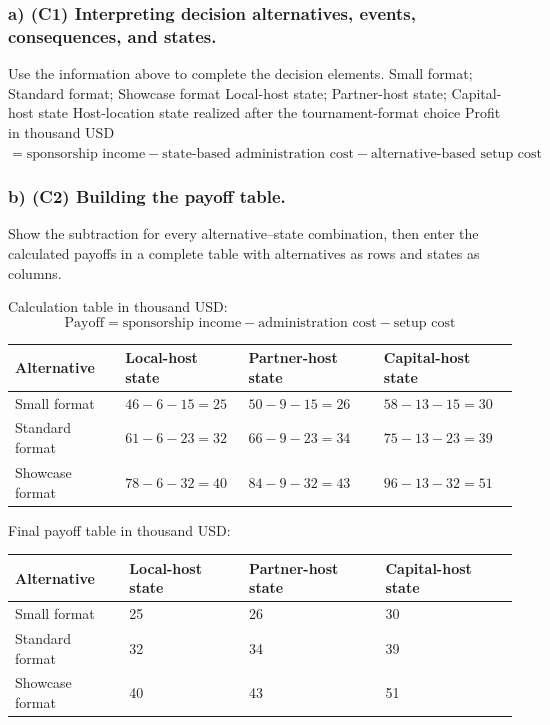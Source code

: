 \subsubsection*{a) \textbf{(C1)} Interpreting decision alternatives, events, consequences, and states.}
\label{subsec:problem12-regional-debate-tournament-c1}
Use the information above to complete the decision elements.
\DecisionElementsTable
{Small format; Standard format; Showcase format}
{Local-host state; Partner-host state; Capital-host state}
{Host-location state realized after the tournament-format choice}
{Profit in thousand USD $= \text{sponsorship income} - \text{state-based administration cost} - \text{alternative-based setup cost}$}
\subsubsection*{b) \textbf{(C2)} Building the payoff table.}
\label{subsec:problem12-regional-debate-tournament-c2}
Show the subtraction for every alternative--state combination, then enter the calculated payoffs in a complete table with alternatives as rows and states as columns.

Calculation table in thousand USD:
\[
\text{Payoff}=\text{sponsorship income}-\text{administration cost}-\text{setup cost}
\]
\begin{center}
\small
\begin{tabular}{llll}
\toprule
Alternative & Local-host state & Partner-host state & Capital-host state \\
\midrule
Small format & $46 - 6 - 15 = 25$ & $50 - 9 - 15 = 26$ & $58 - 13 - 15 = 30$ \\
Standard format & $61 - 6 - 23 = 32$ & $66 - 9 - 23 = 34$ & $75 - 13 - 23 = 39$ \\
Showcase format & $78 - 6 - 32 = 40$ & $84 - 9 - 32 = 43$ & $96 - 13 - 32 = 51$ \\
\bottomrule
\end{tabular}
\end{center}

Final payoff table in thousand USD:
\begin{center}
\begin{tabular}{llll}
\toprule
Alternative & Local-host state & Partner-host state & Capital-host state \\
\midrule
Small format & 25 & 26 & 30 \\
Standard format & 32 & 34 & 39 \\
Showcase format & 40 & 43 & 51 \\
\bottomrule
\end{tabular}
\end{center}

